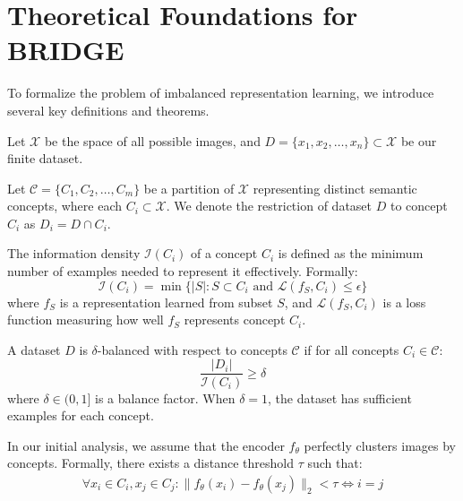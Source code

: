 \clearpage
\setcounter{page}{1}
\maketitlesupplementary


\section{Theoretical Foundations for BRIDGE}\label{app:theory}

\noindent
To formalize the problem of imbalanced representation learning, we introduce several key definitions and theorems.

\begin{definition}
Let $\mathcal{X}$ be the space of all possible images, and $D = \{x_1, x_2, \ldots, x_n\} \subset \mathcal{X}$ be our finite dataset.
\end{definition}

\begin{definition}[Concepts]
Let $\mathcal{C} = \{C_1, C_2, \ldots, C_m\}$ be a partition of $\mathcal{X}$ representing distinct semantic concepts, where each $C_i \subset \mathcal{X}$. We denote the restriction of dataset $D$ to concept $C_i$ as $D_i = D \cap C_i$.
\end{definition}

\begin{definition}
The information density $\mathcal{I}(C_i)$ of a concept $C_i$ is defined as the minimum number of examples needed to represent it effectively. Formally:
\begin{equation}
\mathcal{I}(C_i) = \min\{|S| : S \subset C_i \text{ and } \mathcal{L}(f_S, C_i) \leq \epsilon\}
\end{equation}
where $f_S$ is a representation learned from subset $S$, and $\mathcal{L}(f_S, C_i)$ is a loss function measuring how well $f_S$ represents concept $C_i$.
\end{definition}

\begin{definition}
A dataset $D$ is $\delta$-balanced with respect to concepts $\mathcal{C}$ if for all concepts $C_i \in \mathcal{C}$:
\begin{equation}
\frac{|D_i|}{\mathcal{I}(C_i)} \geq \delta
\end{equation}
where $\delta \in (0,1]$ is a balance factor. When $\delta = 1$, the dataset has sufficient examples for each concept.
\end{definition}

\begin{assumption}
\label{assump:ideal}
In our initial analysis, we assume that the encoder $f_\theta$ perfectly clusters images by concepts. Formally, there exists a distance threshold $\tau$ such that:
\begin{align}
\forall x_i \in C_i, x_j \in C_j: \|f_\theta(x_i) - f_\theta(x_j)\|_2 < \tau \iff i = j
\end{align}
\end{assumption}


